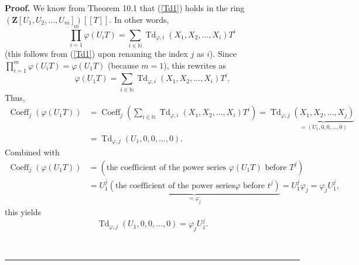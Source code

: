 \documentclass[numbers=enddot,12pt,final,onecolumn,notitlepage]{scrartcl}%
\newenvironment{proof}[1][Proof]{\noindent\textbf{#1.} }{\ \rule{0.5em}{0.5em}}
\begin{document}
\begin{proof}
We know from Theorem 10.1 that (\ref{Td1}) holds in the ring $\left(
\mathbf{Z}\left[  U_{1},U_{2},...,U_{m}\right]  \right)  \left[  \left[
T\right]  \right]  $. In other words,%
\[
\prod\limits_{i=1}^{m}\varphi\left(  U_{i}T\right)  =\sum_{i\in\mathbb{N}%
}\operatorname*{Td}\nolimits_{\varphi,i}\left(  X_{1},X_{2},...,X_{i}\right)
T^{i}%
\]
(this follows from (\ref{Td1}) upon renaming the index $j$ as $i$). Since
$\prod\limits_{i=1}^{m}\varphi\left(  U_{i}T\right)  =\varphi\left(
U_{1}T\right)  $ (because $m=1$), this rewrites as
\[
\varphi\left(  U_{1}T\right)  =\sum_{i\in\mathbb{N}}\operatorname*{Td}%
\nolimits_{\varphi,i}\left(  X_{1},X_{2},...,X_{i}\right)  T^{i}.
\]
Thus,%
\begin{align*}
\operatorname*{Coeff}\nolimits_{j}\left(  \varphi\left(  U_{1}T\right)
\right)   &  =\operatorname*{Coeff}\nolimits_{j}\left(  \sum_{i\in\mathbb{N}%
}\operatorname*{Td}\nolimits_{\varphi,i}\left(  X_{1},X_{2},...,X_{i}\right)
T^{i}\right)  =\operatorname*{Td}\nolimits_{\varphi,j}\underbrace{\left(
X_{1},X_{2},...,X_{j}\right)  }_{=\left(  U_{1},0,0,...,0\right)  }\\
&  =\operatorname*{Td}\nolimits_{\varphi,j}\left(  U_{1},0,0,...,0\right)  .
\end{align*}
Combined with%
\begin{align*}
\operatorname*{Coeff}\nolimits_{j}\left(  \varphi\left(  U_{1}T\right)
\right)   &  =\left(  \text{the coefficient of the power series }%
\varphi\left(  U_{1}T\right)  \text{ before }T^{j}\right) \\
&  =U_{1}^{j}\underbrace{\left(  \text{the coefficient of the power series
}\varphi\text{ before }t^{j}\right)  }_{=\varphi_{j}}=U_{1}^{j}\varphi
_{j}=\varphi_{j}U_{1}^{j},
\end{align*}
this yields
\[
\operatorname*{Td}\nolimits_{\varphi,j}\left(  U_{1},0,0,...,0\right)
=\varphi_{j}U_{1}^{j}.
\]



\end{proof}
\end{document}
